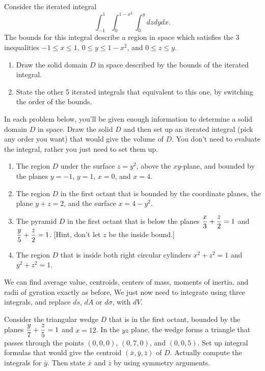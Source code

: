 \begin{problem}
Consider the iterated integral $$\int_{-1}^1\int_0^{1-x^2}\int_0^{y} dzdydx.$$
The bounds for this integral describe a region in space which satisfies the 3 inequalities $-1\leq x\leq 1$, $0\leq y\leq 1-x^2$, and $0\leq z\leq y$.
\begin{enumerate}
 \item Draw the solid domain $D$ in space described by the bounds of the iterated integral.
 \item State the other 5 iterated integrals that equivalent to this one, by switching the order of the bounds.
\end{enumerate}
\end{problem}



\begin{problem}
 In each problem below, you'll be given enough information to determine a solid domain $D$ in space. Draw the solid $D$ and then set up an iterated integral (pick any order you want) that would give the volume of $D$.  You don't need to evaluate the integral, rather you just need to set them up.
\begin{enumerate}
 \item The region $D$ under the surface $z=y^2$, above the $xy$-plane, and bounded by the planes $y=-1$, $y=1$, $x=0$, and $x=4$.
 \item The region $D$ in the first octant that is bounded by the coordinate planes, the plane $y+z=2$, and the surface $x=4-y^2$.
 \item The pyramid $D$ in the first octant that is below the planes $\displaystyle\frac{x}{3}+\frac{z}{2}=1$ and $\displaystyle\frac{y}{5}+\frac{z}{2}=1$. [Hint, don't let $z$ be the inside bound.]
 \item The region $D$ that is inside both right circular cylinders $x^2+z^2=1$ and $y^2+z^2=1$.
\end{enumerate}
\end{problem}

We can find average value, centroids, centers of mass, moments of inertia, and radii of gyration exactly as before,  We just now need to integrate using three integrals, and replace $ds$, $dA$ or $d\sigma$, with $dV$.  
\begin{problem}
 Consider the triangular wedge $D$ that is in the first octant, bounded by the planes $\displaystyle\frac{y}{7}+\frac{z}{5}=1$ and $x=12$. In the $yz$ plane, the wedge forms a triangle that passes through the points $(0,0,0)$,  $(0,7,0)$, and $(0,0,5)$.  Set up integral formulas that would give the centroid $(\bar x,\bar y, \bar z)$ of $D$.  Actually compute the integrals for $\bar y$. Then state $\bar x$ and $\bar z$ by using symmetry arguments.
\end{problem}

